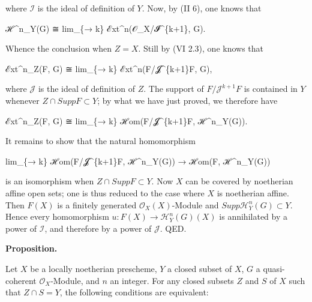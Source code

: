 \documentclass[
]{article}
\newenvironment{Shaded}{}{}
\newcommand{\NormalTok}[1]{#1}
\begin{document}
where \(\mathcal{I}\) is the ideal of definition of \(Y\). Now, by (II
6), one knows that

\begin{Shaded}
\begin{Highlighting}[]
\NormalTok{ℋ\^{}n\_Y(G) ≅ lim\_\{→ k\} ℰxt\^{}n(𝒪\_X/𝓘\^{}\{k+1\}, G).}
\end{Highlighting}
\end{Shaded}

Whence the conclusion when \(Z = X\). Still by (VI 2.3), one knows that

\begin{Shaded}
\begin{Highlighting}[]
\NormalTok{ℰxt\^{}n\_Z(F, G) ≅ lim\_\{→ k\} ℰxt\^{}n(F/𝓙\^{}\{k+1\}F, G),}
\end{Highlighting}
\end{Shaded}

where \(\mathcal{J}\) is the ideal of definition of \(Z\). The support
of \(F/\mathcal{J}^{k+1}F\) is contained in \(Y\) whenever
\(Z \cap Supp F \subset Y\); by what we have just proved, we therefore
have

\begin{Shaded}
\begin{Highlighting}[]
\NormalTok{ℰxt\^{}n\_Z(F, G) ≅ lim\_\{→ k\} ℋom(F/𝓙\^{}\{k+1\}F, ℋ\^{}n\_Y(G)).}
\end{Highlighting}
\end{Shaded}

It remains to show that the natural homomorphism

\begin{Shaded}
\begin{Highlighting}[]
\NormalTok{lim\_\{→ k\} ℋom(F/𝓙\^{}\{k+1\}F, ℋ\^{}n\_Y(G)) → ℋom(F, ℋ\^{}n\_Y(G))}
\end{Highlighting}
\end{Shaded}

is an isomorphism when \(Z \cap Supp F \subset Y\). Now \(X\) can be
covered by noetherian affine open sets; one is thus reduced to the case
where \(X\) is noetherian affine. Then \(F(X)\) is a finitely generated
\(\mathcal{O}_{X}(X)\)-Module and
\(Supp \mathcal{H}^{n}_{Y}(G) \subset Y\). Hence every homomorphism
\(u: F(X) \to \mathcal{H}^{n}_{Y}(G)(X)\) is annihilated by a power of
\(\mathcal{I}\), and therefore by a power of \(\mathcal{J}\). QED.

\textbf{Proposition.}

Let \(X\) be a locally noetherian prescheme, \(Y\) a closed subset of
\(X\), \(G\) a quasi-coherent \(\mathcal{O}_{X}\)-Module, and \(n\) an
integer. For any closed subsets \(Z\) and \(S\) of \(X\) such that
\(Z \cap S = Y\), the following conditions are equivalent:
\end{document}
